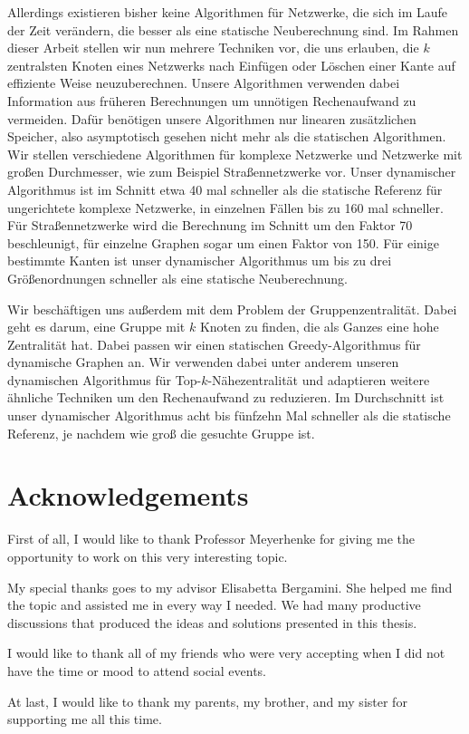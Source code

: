 Allerdings existieren bisher keine Algorithmen für Netzwerke, die sich im Laufe der Zeit verändern, die besser als eine statische Neuberechnung sind. Im Rahmen dieser Arbeit stellen wir nun mehrere Techniken vor, die uns erlauben, die $k$ zentralsten Knoten eines Netzwerks nach Einfügen oder Löschen einer Kante auf effiziente Weise neuzuberechnen. Unsere Algorithmen verwenden dabei Information aus früheren Berechnungen um unnötigen Rechenaufwand zu vermeiden. Dafür benötigen unsere Algorithmen nur linearen zusätzlichen Speicher, also asymptotisch gesehen nicht mehr als die statischen Algorithmen. Wir stellen verschiedene Algorithmen für komplexe Netzwerke und Netzwerke mit großen Durchmesser, wie zum Beispiel Straßennetzwerke vor. Unser dynamischer Algorithmus ist im Schnitt etwa 40 mal schneller als die statische Referenz für ungerichtete komplexe Netzwerke, in einzelnen Fällen bis zu 160 mal schneller. Für Straßennetzwerke wird die Berechnung im Schnitt um den Faktor 70 beschleunigt, für einzelne Graphen sogar um einen Faktor von 150. Für einige bestimmte Kanten ist unser dynamischer Algorithmus um bis zu drei Größenordnungen schneller als eine statische Neuberechnung.

Wir beschäftigen uns außerdem mit dem Problem der Gruppenzentralität. Dabei geht es darum, eine Gruppe mit $k$ Knoten zu finden, die als Ganzes eine hohe Zentralität hat. Dabei passen wir einen statischen Greedy-Algorithmus für dynamische Graphen an. Wir verwenden dabei unter anderem unseren dynamischen Algorithmus für Top-$k$-Nähezentralität und adaptieren weitere ähnliche Techniken um den Rechenaufwand zu reduzieren. Im Durchschnitt ist unser dynamischer Algorithmus acht bis fünfzehn Mal schneller als die statische Referenz, je nachdem wie groß die gesuchte Gruppe ist.

\chapter{Acknowledgements}

First of all, I would like to thank Professor Meyerhenke for giving me the opportunity to work on this very interesting topic.

My special thanks goes to my advisor Elisabetta Bergamini. She helped me find the topic and assisted me in every way I needed. We had many productive discussions that produced the ideas and solutions presented in this thesis.

I would like to thank all of my friends who were very accepting when I did not have the time or mood to attend social events.

At last, I would like to thank my parents, my brother, and my sister for supporting me all this time.